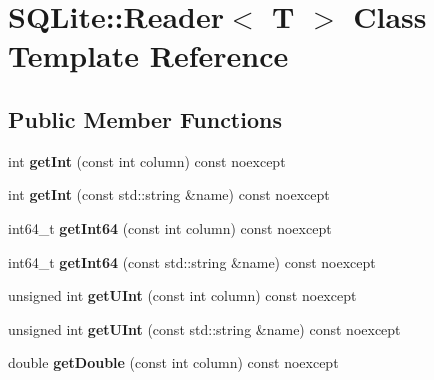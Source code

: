 \hypertarget{class_s_q_lite_1_1_reader}{\section{S\-Q\-Lite\-:\-:Reader$<$ T $>$ Class Template Reference}
\label{class_s_q_lite_1_1_reader}
}
\subsection*{Public Member Functions}
\begin{DoxyCompactItemize}
\item 
\hypertarget{class_s_q_lite_1_1_reader_a82c5bc45048b8328a2fcc9bb4ff975f2}{int {\bfseries get\-Int} (const int column) const noexcept}\label{class_s_q_lite_1_1_reader_a82c5bc45048b8328a2fcc9bb4ff975f2}

\item 
\hypertarget{class_s_q_lite_1_1_reader_a87dd8234c2bd5f19466813f8a68ab80a}{int {\bfseries get\-Int} (const std\-::string \&name) const noexcept}\label{class_s_q_lite_1_1_reader_a87dd8234c2bd5f19466813f8a68ab80a}

\item 
\hypertarget{class_s_q_lite_1_1_reader_adb7b9705a4638d6d5af5ca26dfa474ff}{int64\-\_\-t {\bfseries get\-Int64} (const int column) const noexcept}\label{class_s_q_lite_1_1_reader_adb7b9705a4638d6d5af5ca26dfa474ff}

\item 
\hypertarget{class_s_q_lite_1_1_reader_aea6d24bb9247bfc52fe77d62be961dd2}{int64\-\_\-t {\bfseries get\-Int64} (const std\-::string \&name) const noexcept}\label{class_s_q_lite_1_1_reader_aea6d24bb9247bfc52fe77d62be961dd2}

\item 
\hypertarget{class_s_q_lite_1_1_reader_a971fb706b9215a89532ac48640f94832}{unsigned int {\bfseries get\-U\-Int} (const int column) const noexcept}\label{class_s_q_lite_1_1_reader_a971fb706b9215a89532ac48640f94832}

\item 
\hypertarget{class_s_q_lite_1_1_reader_a18315a8379249158c3f827441e8f6de0}{unsigned int {\bfseries get\-U\-Int} (const std\-::string \&name) const noexcept}\label{class_s_q_lite_1_1_reader_a18315a8379249158c3f827441e8f6de0}

\item 
\hypertarget{class_s_q_lite_1_1_reader_a679e56078c78e01c99fa08ad0b7ee782}{double {\bfseries get\-Double} (const int column) const noexcept}\label{class_s_q_lite_1_1_reader_a679e56078c78e01c99fa08ad0b7ee782}


\end{DoxyCompactItemize}
